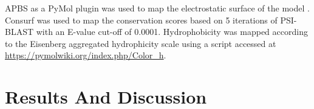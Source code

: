 
APBS as a PyMol plugin was used to map the electrostatic surface of the model \cite{Baker2001}.
Consurf \cite{Ashkenazy2010} was used to map the conservation scores based on 5 iterations of PSI-BLAST \cite{Altschul1997} with an E-value cut-off of 0.0001.
Hydrophobicity was mapped according to the Eisenberg aggregated hydrophicity scale \cite{Eisenberg1984} using a script accessed at \url{https://pymolwiki.org/index.php/Color_h}.


\section{Results And Discussion}

